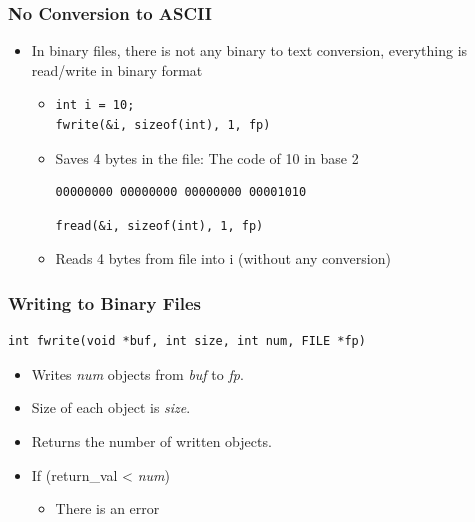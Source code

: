 \documentclass{../c-lecture}
\begin{document}
\begin{frame}[fragile]
  \frametitle{No Conversion to ASCII}
  \begin{itemize}
    \item
      In binary files, there is not any binary to text conversion, everything
      is read/write in binary format

    \begin{itemize}
      \item[]
      \begin{verbatim}
int i = 10;
fwrite(&i, sizeof(int), 1, fp)
      \end{verbatim}
      \item Saves 4 bytes in the file: The code of 10 in base 2
      \begin{verbatim}
00000000 00000000 00000000 00001010
      \end{verbatim}
      \begin{verbatim}
fread(&i, sizeof(int), 1, fp)
      \end{verbatim}
      \item Reads 4 bytes from file into i (without any conversion)
    \end{itemize}
  \end{itemize}
\end{frame}

\begin{frame}[fragile]
  \frametitle{Writing to Binary Files}
  \begin{verbatim}
int fwrite(void *buf, int size, int num, FILE *fp)
  \end{verbatim}
  \begin{itemize}
    \item
      Writes \textit{\color{YellowOrange} num} objects from
      \textit{\color{LimeGreen} buf} to \textit{\color{Violet} fp}.
    \item Size of each object is \textit{\color{Yellow} size}.
    \item Returns the number of written objects.
    \item If (return\_val < \textit{\color{YellowOrange} num})
    \begin{itemize}
      \item There is an error
    \end{itemize}
  \end{itemize}
\end{frame}
\end{document}
